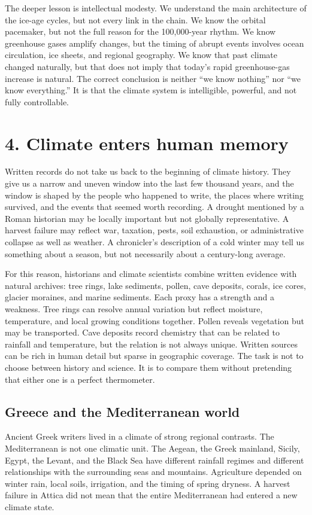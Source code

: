 ﻿\documentclass[12pt,a4paper]{book}
\begin{document}
The deeper lesson is intellectual modesty. We understand the main architecture of the ice-age cycles, but not every link in the chain. We know the orbital pacemaker, but not the full reason for the 100,000-year rhythm. We know greenhouse gases amplify changes, but the timing of abrupt events involves ocean circulation, ice sheets, and regional geography. We know that past climate changed naturally, but that does not imply that today's rapid greenhouse-gas increase is natural. The correct conclusion is neither ``we know nothing'' nor ``we know everything.'' It is that the climate system is intelligible, powerful, and not fully controllable.

\section{4. Climate enters human memory}
Written records do not take us back to the beginning of climate history. They give us a narrow and uneven window into the last few thousand years, and the window is shaped by the people who happened to write, the places where writing survived, and the events that seemed worth recording. A drought mentioned by a Roman historian may be locally important but not globally representative. A harvest failure may reflect war, taxation, pests, soil exhaustion, or administrative collapse as well as weather. A chronicler's description of a cold winter may tell us something about a season, but not necessarily about a century-long average.

For this reason, historians and climate scientists combine written evidence with natural archives: tree rings, lake sediments, pollen, cave deposits, corals, ice cores, glacier moraines, and marine sediments. Each proxy has a strength and a weakness. Tree rings can resolve annual variation but reflect moisture, temperature, and local growing conditions together. Pollen reveals vegetation but may be transported. Cave deposits record chemistry that can be related to rainfall and temperature, but the relation is not always unique. Written sources can be rich in human detail but sparse in geographic coverage. The task is not to choose between history and science. It is to compare them without pretending that either one is a perfect thermometer.

\subsection{Greece and the Mediterranean world}
Ancient Greek writers lived in a climate of strong regional contrasts. The Mediterranean is not one climatic unit. The Aegean, the Greek mainland, Sicily, Egypt, the Levant, and the Black Sea have different rainfall regimes and different relationships with the surrounding seas and mountains. Agriculture depended on winter rain, local soils, irrigation, and the timing of spring dryness. A harvest failure in Attica did not mean that the entire Mediterranean had entered a new climate state.
\end{document}
